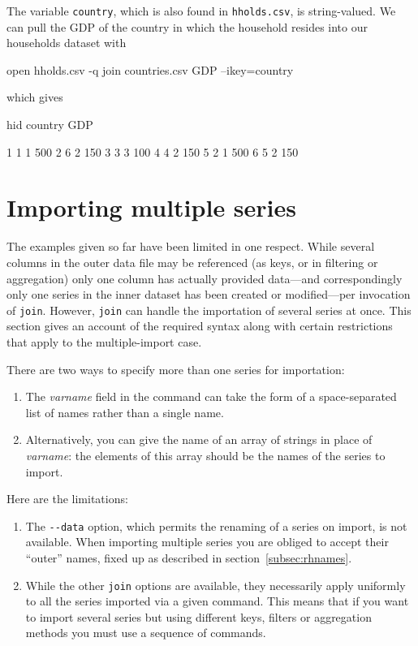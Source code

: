 The variable \texttt{country}, which is also found in
\texttt{hholds.csv}, is string-valued. We can pull the GDP of the
country in which the household resides into our households dataset
with
\begin{code}
open hholds.csv -q
join countries.csv GDP --ikey=country
\end{code}
which gives
\begin{code}
           hid      country          GDP

1            1            1          500
2            6            2          150
3            3            3          100
4            4            2          150
5            2            1          500
6            5            2          150
\end{code}

\section{Importing multiple series}
\label{sec:join-multi}

The examples given so far have been limited in one respect. While
several columns in the outer data file may be referenced (as keys, or
in filtering or aggregation) only one column has actually provided
data---and correspondingly only one series in the inner dataset has
been created or modified---per invocation of \texttt{join}. However,
\texttt{join} can handle the importation of several series at
once. This section gives an account of the required syntax along with
certain restrictions that apply to the multiple-import case.

There are two ways to specify more than one series for importation:
\begin{enumerate}
\item The \textsl{varname} field in the command can take the form of
  a space-separated list of names rather than a single name.
\item Alternatively, you can give the name of an array of strings
  in place of \textsl{varname}: the elements of this array should be
  the names of the series to import.
\end{enumerate}

Here are the limitations:
\begin{enumerate}
\item The \verb|--data| option, which permits the renaming of a series
  on import, is not available. When importing multiple series you
  are obliged to accept their ``outer'' names, fixed up as described
  in section~\ref{subsec:rhnames}.
\item While the other \texttt{join} options are available, they
  necessarily apply uniformly to all the series imported via a given
  command. This means that if you want to import several series but
  using different keys, filters or aggregation methods you must use a
  sequence of commands.
\end{enumerate}

